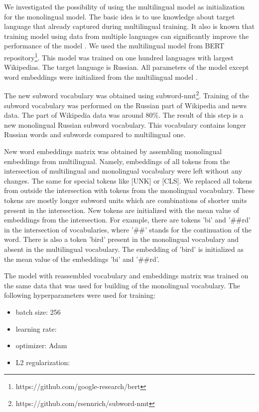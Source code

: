 \documentclass{article}
\begin{document}
We investigated the possibility of using the multilingual model as initialization for the monolingual model. The basic idea is to use knowledge about target language that already captured during multilingual training. It also is known that training model using data from multiple languages can significantly improve the performance of the model \cite{mulcaire2018polyglot}.
We used the multilingual model from BERT repository\footnote{https://github.com/google-research/bert}.
This model was trained on one hundred languages with largest Wikipedias.
The target language is Russian. All parameters of the model except word embeddings were initialized from the multilingual model \cite{mulcaire2018polyglot}. 

The new subword vocabulary was obtained using subword-nmt\footnote{https://github.com/rsennrich/subword-nmt}.
Training of the subword vocabulary was performed on the Russian part of Wikipedia and news data.
The part of Wikipedia data was around 80\%. The result of this step is a new monolingual Russian subword vocabulary. This vocabulary contains longer Russian words and subwords compared to multilingual one.  

New word embeddings matrix was obtained by assembling monolingual embeddings from multilingual. Namely, embeddings of all tokens from the intersection of multilingual and monolingual vocabulary were left without any changes. The same for special tokens like [UNK] or [CLS]. We replaced all tokens from outside the intersection with tokens from the monolingual vocabulary. These tokens are mostly longer subword units which are combinations of shorter units present in the intersection. New tokens are initialized with the mean value of embeddings from the intersection. For example, there are tokens 'bi' and '\#\#rd' in the intersection of vocabularies, where '\#\#' stands for the continuation of the word. There is also a token 'bird' present in the monolingual vocabulary and absent in the multilingual vocabulary. The embedding of 'bird' is initialized as the mean value of the embeddings 'bi' and '\#\#rd'.

The model with reassembled vocabulary and embeddings matrix was trained on the same data that was used for building of the monolingual vocabulary. The following hyperparameters were used for training:
\begin{itemize}
    \item batch size: 256
    \item learning rate: 
    \item optimizer: Adam
    \item L2 regularization: 
\end{itemize}
\end{document}
